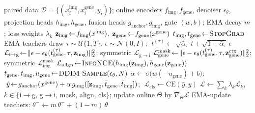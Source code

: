 \begin{algorithm}[t]
\caption{JPathGene training}
\label{alg:step}
\begin{algorithmic}[1]
\Require paired data $\mathcal{D}\!=\!\{(x^{\mathrm{img}}_i,x^{\mathrm{gene}}_i,y_i)\}$; online encoders $f_{\mathrm{img}},f_{\mathrm{gene}}$, denoiser $\epsilon_\theta$, projection heads $h_{\mathrm{img}},h_{\mathrm{gene}}$, fusion heads $g_{\mathrm{anchor}},g_{\mathrm{img}}$, gate $(w,b)$; EMA decay $m$; loss weights $\lambda_k$
\State $\mathbf{z}_{\mathrm{img}}\!\gets\!f_{\mathrm{img}}(x^{\mathrm{img}})$, $\mathbf{z}_{\mathrm{gene}}\!\gets\!f_{\mathrm{gene}}(x^{\mathrm{gene}})$ 
\State $t_{\mathrm{img}},t_{\mathrm{gene}}\!\gets\!\textsc{StopGrad}$ EMA teachers 
\State draw $\tau\!\sim\!\mathcal{U}\{1,T\}$, $\epsilon\!\sim\!\mathcal{N}(0,I)$; $\;t^{(\tau)}\!\gets\!\sqrt{\bar\alpha_\tau}\,t+\sqrt{1-\bar\alpha_\tau}\,\epsilon$
\State $\mathcal{L}_{\mathrm{i\to g}}\!\gets\!\|\epsilon-\epsilon_\theta(t^{(\tau)}_{\mathrm{gene}},\tau,\mathbf{z}_{\mathrm{img}})\|_2^2$; symmetric $\mathcal{L}_{\mathrm{g\to i}}$ 
\State $\mathcal{L}^{\mathrm{mask}}_{\mathrm{gene}}\!\gets\!\|\epsilon-\epsilon_\theta(t^{(\tau)}_{\mathrm{gene}},\tau,\mathbf{z}_{\mathrm{gene}}^{\mathrm{ctx}})\|_2^2$; symmetric $\mathcal{L}^{\mathrm{mask}}_{\mathrm{img}}$ 
\State $\mathcal{L}_{\mathrm{align}}\!\gets\!\textsc{InfoNCE}(h_{\mathrm{img}}(\mathbf{z}_{\mathrm{img}}),h_{\mathrm{gene}}(\mathbf{z}_{\mathrm{gene}}))$ 
\State $\bar t_{\mathrm{gene}},\bar t_{\mathrm{img}},u_{\mathrm{gene}}\!\gets\!\textsc{DDIM-Sample}(\epsilon_\theta,N)$ 
\State $\alpha\!\gets\!\sigma\!\big(w(-u_{\mathrm{gene}})+b\big)$; $\;\hat y\!\gets\!g_{\mathrm{anchor}}(x^{\mathrm{gene}})+\alpha\,g_{\mathrm{img}}([\mathbf{z}_{\mathrm{img}},\bar t_{\mathrm{gene}},\bar t_{\mathrm{img}}])$; $\;\mathcal{L}_{\mathrm{cls}}\!\gets\!\mathrm{CE}(\hat y,y)$ 
\State $\mathcal{L}\!\gets\!\textstyle\sum_{k}\lambda_k\mathcal{L}_k$, $k\in\{$i$\to$g, g$\to$i, mask, align, cls$\}$; update online $\Theta$ by $\nabla_\Theta\mathcal{L}$
\State EMA-update teachers: $\theta^{-}\!\gets\!m\,\theta^{-}+(1-m)\,\theta$
\EndFor
\EndFor
\end{algorithmic}
\end{algorithm}

